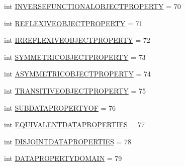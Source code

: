 \begin{DoxyCompactItemize}
\item 
int \hyperlink{interfaceorg_1_1coode_1_1owlapi_1_1functionalparser_1_1_o_w_l_functional_syntax_parser_constants_afbc6ddd050dc050552cfe44225300bc3}{I\-N\-V\-E\-R\-S\-E\-F\-U\-N\-C\-T\-I\-O\-N\-A\-L\-O\-B\-J\-E\-C\-T\-P\-R\-O\-P\-E\-R\-T\-Y} = 70
\item 
int \hyperlink{interfaceorg_1_1coode_1_1owlapi_1_1functionalparser_1_1_o_w_l_functional_syntax_parser_constants_adb767e538fe1ba433f7c23115750d736}{R\-E\-F\-L\-E\-X\-I\-V\-E\-O\-B\-J\-E\-C\-T\-P\-R\-O\-P\-E\-R\-T\-Y} = 71
\item 
int \hyperlink{interfaceorg_1_1coode_1_1owlapi_1_1functionalparser_1_1_o_w_l_functional_syntax_parser_constants_a95b6059648e829650d04b602812ecdf6}{I\-R\-R\-E\-F\-L\-E\-X\-I\-V\-E\-O\-B\-J\-E\-C\-T\-P\-R\-O\-P\-E\-R\-T\-Y} = 72
\item 
int \hyperlink{interfaceorg_1_1coode_1_1owlapi_1_1functionalparser_1_1_o_w_l_functional_syntax_parser_constants_a4a746205f2acc7ebbd175eec48916057}{S\-Y\-M\-M\-E\-T\-R\-I\-C\-O\-B\-J\-E\-C\-T\-P\-R\-O\-P\-E\-R\-T\-Y} = 73
\item 
int \hyperlink{interfaceorg_1_1coode_1_1owlapi_1_1functionalparser_1_1_o_w_l_functional_syntax_parser_constants_a3244f97a8c43811e756e9a06d2557faf}{A\-S\-Y\-M\-M\-E\-T\-R\-I\-C\-O\-B\-J\-E\-C\-T\-P\-R\-O\-P\-E\-R\-T\-Y} = 74
\item 
int \hyperlink{interfaceorg_1_1coode_1_1owlapi_1_1functionalparser_1_1_o_w_l_functional_syntax_parser_constants_ad0cbddef93c0a76f8f34b6ddfcab620a}{T\-R\-A\-N\-S\-I\-T\-I\-V\-E\-O\-B\-J\-E\-C\-T\-P\-R\-O\-P\-E\-R\-T\-Y} = 75
\item 
int \hyperlink{interfaceorg_1_1coode_1_1owlapi_1_1functionalparser_1_1_o_w_l_functional_syntax_parser_constants_a850a0d63e71e00925fb5c7e4c242f559}{S\-U\-B\-D\-A\-T\-A\-P\-R\-O\-P\-E\-R\-T\-Y\-O\-F} = 76
\item 
int \hyperlink{interfaceorg_1_1coode_1_1owlapi_1_1functionalparser_1_1_o_w_l_functional_syntax_parser_constants_a94697317f767800576b537b80c56ff71}{E\-Q\-U\-I\-V\-A\-L\-E\-N\-T\-D\-A\-T\-A\-P\-R\-O\-P\-E\-R\-T\-I\-E\-S} = 77
\item 
int \hyperlink{interfaceorg_1_1coode_1_1owlapi_1_1functionalparser_1_1_o_w_l_functional_syntax_parser_constants_a5692c05569121ce84c4ef32238dad26f}{D\-I\-S\-J\-O\-I\-N\-T\-D\-A\-T\-A\-P\-R\-O\-P\-E\-R\-T\-I\-E\-S} = 78
\item 
int \hyperlink{interfaceorg_1_1coode_1_1owlapi_1_1functionalparser_1_1_o_w_l_functional_syntax_parser_constants_a684e3dfbb5245f39e197465afe07f729}{D\-A\-T\-A\-P\-R\-O\-P\-E\-R\-T\-Y\-D\-O\-M\-A\-I\-N} = 79

\end{DoxyCompactItemize}
